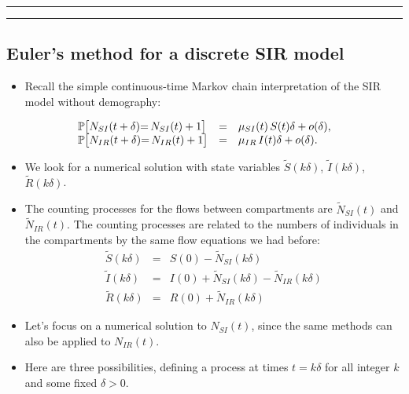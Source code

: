 \documentclass[]{article}
\providecommand{\tightlist}{%
  \setlength{\itemsep}{0pt}\setlength{\parskip}{0pt}}
\begin{document}
\begin{center}\rule{0.5\linewidth}{\linethickness}\end{center}

\begin{center}\rule{0.5\linewidth}{\linethickness}\end{center}

\subsection{Euler's method for a discrete SIR
model}\label{eulers-method-for-a-discrete-sir-model}

\begin{itemize}
\tightlist
\item
  Recall the simple continuous-time Markov chain interpretation of the
  SIR model without demography:
\end{itemize}

\[\begin{array}{lcl}
\mathbb{P}\big[N_{SI}(t+\delta){=\,} N_{SI}(t)+1\big] &=& \mu_{SI}(t) \, S(t) \delta + o(\delta),
\\
\mathbb{P}\big[N_{IR}(t+\delta){=\,} N_{IR}(t)+1\big] &=& \mu_{IR} \, I(t) \delta + o(\delta).
\end{array}\]

\begin{itemize}
\item
  We look for a numerical solution with state variables
  \(\tilde S(k\delta)\), \(\tilde I(k\delta)\), \(\tilde R(k\delta)\).
\item
  The counting processes for the flows between compartments are
  \(\tilde N_{SI}(t)\) and \(\tilde N_{IR}(t)\). The counting processes
  are related to the numbers of individuals in the compartments by the
  same flow equations we had before: \[\begin{array}{lcl} 
  \tilde S(k\delta)&=& S(0) - \tilde N_{SI}(k\delta)
  \\
  \tilde I(k\delta)&=& I(0) + \tilde N_{SI}(k\delta) - \tilde N_{IR}(k\delta)
  \\
  \tilde R(k\delta) &=& R(0) + \tilde N_{IR}(k\delta)
  \end{array}\]
\item
  Let's focus on a numerical solution to \(N_{SI}(t)\), since the same
  methods can also be applied to \(N_{IR}(t)\).
\item
  Here are three possibilities, defining a process at times
  \(t=k\delta\) for all integer \(k\) and some fixed \(\delta>0\).
\end{itemize}
\end{document}
